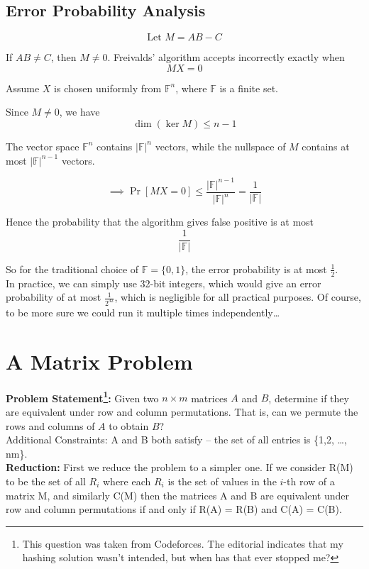 \documentclass[11pt,openany]{book}
\begin{document}
\subsection{Error Probability Analysis}

\[
\text{Let }M=AB-C
\]

If \(AB\neq C\), then \(M\neq0\). Freivalds' algorithm accepts incorrectly exactly when
\[
MX=0
\]

Assume \(X\) is chosen uniformly from \(\mathbb{F}^n\), where \(\mathbb{F}\) is a finite set.

Since \(M\neq0\), we have
\[
\dim(\ker M)\le n-1
\]

The vector space \(\mathbb{F}^n\) contains \( |\mathbb{F}|^n \) vectors, while the nullspace of \(M\) contains at most
$|\mathbb{F}|^{n-1}$
vectors.

\[
\implies
\Pr[MX=0]
\le
\frac{|\mathbb{F}|^{n-1}}{|\mathbb{F}|^n}
=
\frac1{|\mathbb{F}|}
\]

Hence the probability that the algorithm gives false positive is at most
\[
\frac1{|\mathbb{F}|}
\]

So for the traditional choice of \(\mathbb{F}=\{0,1\}\), the error probability is at most \(\frac12\).\\
In practice, we can simply use 32-bit integers, which would give an error probability of at most \(\frac1{2^{32}}\), 
which is negligible for all practical purposes. Of course, to be more sure we could run it multiple times independently\dots


\section{A Matrix Problem}

\textbf{Problem Statement\footnote{This question was taken from Codeforces. The editorial indicates that my hashing solution wasn't intended, but when has that ever stopped me?}:} Given two \(n\times m\) matrices \(A\) and \(B\), determine if they are equivalent under row and column permutations. That is, can we permute the rows and columns of \(A\) to obtain \(B\)?
\\ Additional Constraints: A and B both satisfy -- the set of all entries is \{1,2, \dots, nm\}. \\

\noindent \textbf{Reduction:} First we reduce the problem to a simpler one. If we consider R(M) to be the set of all $R_i$ where each $R_i$ is the set of values in the 
$i$-th row of a matrix M, and similarly C(M) then the matrices A and B are equivalent under row and column permutations
if and only if R(A) = R(B) and C(A) = C(B).
\end{document}
